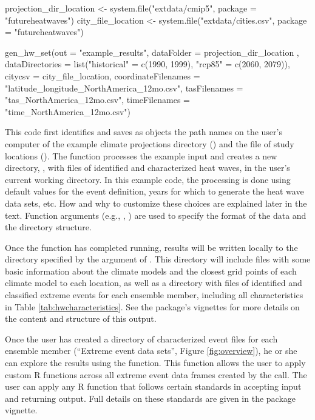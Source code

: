 \begin{Schunk}
\begin{Sinput}
projection_dir_location <- system.file("extdata/cmip5",
                                       package = "futureheatwaves")
city_file_location <- system.file("extdata/cities.csv",
                                  package = "futureheatwaves")

gen_hw_set(out = "example_results",
           dataFolder = projection_dir_location ,
           dataDirectories = list("historical" = c(1990, 1999),
                                        "rcp85" = c(2060, 2079)),
           citycsv = city_file_location,
           coordinateFilenames = "latitude_longitude_NorthAmerica_12mo.csv",
           tasFilenames = "tas_NorthAmerica_12mo.csv",
           timeFilenames = "time_NorthAmerica_12mo.csv")
\end{Sinput}
\end{Schunk}

This code first identifies and saves as objects the path names on the
user's computer of the example climate projections directory
() and the file of study locations
(). The  function
processes the example input and creates a new directory,
, with files of identified and characterized heat
waves, in the user's current working directory. In this example code,
the processing is done using default values for the event definition,
years for which to generate the heat wave data sets, etc. How and why to
customize these choices are explained later in the text. Function
arguments (e.g., , ) are used
to specify the format of the data and the directory structure.

Once the function has completed running, results will be written locally
to the directory specified by the  argument of
. This directory will include files with some basic
information about the climate models and the closest grid points of each
climate model to each location, as well as a directory with files of
identified and classified extreme events for each ensemble member,
including all characteristics in Table \ref{tab:hwcharacteristics}. See
the package's vignettes for more details on the content and structure of
this output.

Once the user has created a directory of characterized event files for
each ensemble member (``Extreme event data sets'', Figure
\ref{fig:overview}), he or she can explore the results using the
 function. This function allows the user to
apply custom R functions across all extreme event data frames created by
the  call. The user can apply any R function that
follows certain standards in accepting input and returning output. Full
details on these standards are given in the 
package vignette.

